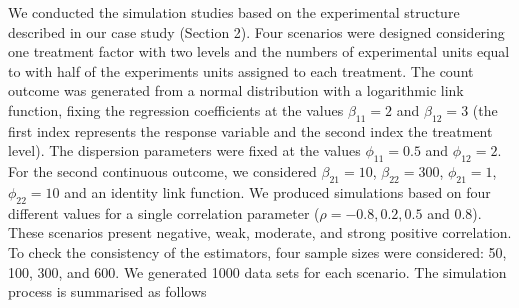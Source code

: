 \documentclass[useAMS,referee]{biom}
\begin{document}
We conducted the simulation studies based on the experimental structure described in our case study (Section 2). Four scenarios were designed considering one treatment factor with two levels and the numbers of experimental units equal to with half of the experiments units assigned to each treatment. The count outcome was generated from a normal distribution with a logarithmic link function, fixing the regression coefficients at the values $\beta_{11}=2$ and $\beta_{12}=3$ (the first index represents the response variable and the second index the treatment level). The dispersion parameters were fixed at the values $\phi_{11}=0.5$ and $\phi_{12}=2$. For the second continuous outcome, we considered $\beta_{21}=10$, $\beta_{22}=300$, $\phi_{21}=1$, $\phi_{22}=10$ and an identity link function. We produced simulations based on four different values for a single correlation parameter ($\rho = -0.8, 0.2, 0.5$ and $0.8$). These scenarios present negative, weak, moderate, and strong positive correlation. To check the consistency of the estimators, four sample sizes were considered: 50, 100, 300, and 600. We generated 1000 data sets for each scenario. The simulation process is summarised as follows
\end{document}

